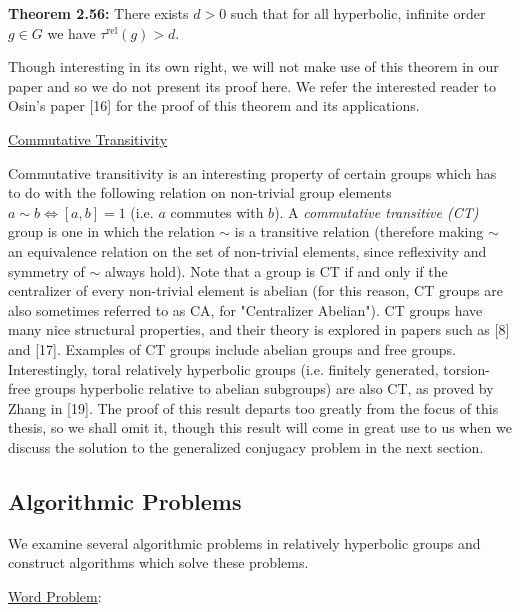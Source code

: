 \documentclass[12pt]{article}
\newcommand{\vs}{\vskip10pt}
\begin{document}
	\vs 
	
	\textbf{Theorem 2.56: } There exists $d > 0$ such that for all hyperbolic, infinite order $g \in G$ we have $\tau^{\text{rel}}(g) > d$. 
	
	\vs 
	
	Though interesting in its own right, we will not make use of this theorem in our paper and so we do not present its proof here. We refer the interested reader to Osin's paper [16] for the proof of this theorem and its applications. 
	
	\vs 
	
	\underline{Commutative Transitivity}
	
	\vs 
	
	Commutative transitivity is an interesting property of certain groups which has to do with the following relation on non-trivial group elements $a \sim b \iff [a,b] = 1$ (i.e. $a$ commutes with $b$). A \textit{commutative transitive (CT)} group is one in which the relation $\sim$ is a transitive relation (therefore making $\sim$ an equivalence relation on the set of non-trivial elements, since reflexivity and symmetry of $\sim$ always hold). Note that a group is CT if and only if the centralizer of every non-trivial element is abelian (for this reason, CT groups are also sometimes referred to as CA, for "Centralizer Abelian"). CT groups have many nice structural properties, and their theory is explored in papers such as [8] and [17]. Examples of CT groups include abelian groups and free groups. Interestingly, toral relatively hyperbolic groups (i.e. finitely generated, torsion-free groups hyperbolic relative to abelian subgroups) are also CT, as proved by Zhang in [19]. The proof of this result departs too greatly from the focus of this thesis, so we shall omit it, though this result will come in great use to us when we discuss the solution to the generalized conjugacy problem in the next section. 
		
		
		\newpage
	\subsection{Algorithmic Problems}
	
	We examine several algorithmic problems in relatively hyperbolic groups and construct algorithms which solve these problems. 
	
	\vs 
	
	\underline{Word Problem}: 
	
	\vs 
	
\end{document}
